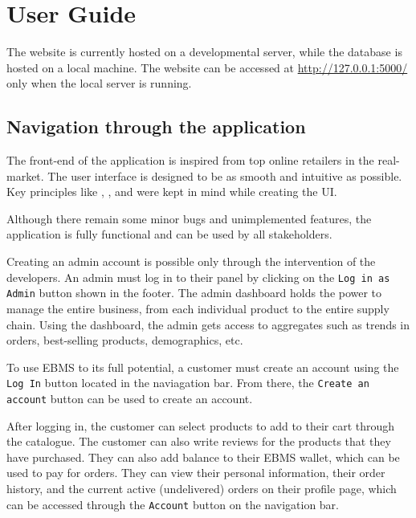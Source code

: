 \section{User Guide}

The website is currently hosted on a developmental server, while the database is hosted on a local machine.
The website can be accessed at \url{http://127.0.0.1:5000/} only when the local server is running.

\subsection*{Navigation through the application}

The front-end of the application is inspired from top online retailers in the real-market.
The user interface is designed to be as smooth and intuitive as possible.
Key principles like , , and  were kept in mind while creating the UI.

Although there remain some minor bugs and unimplemented features, the application is fully functional and can be used by all stakeholders.

\begin{stakeholder}
    Creating an admin account is possible only through the intervention of the developers.
    An admin must log in to their panel by clicking on the \texttt{Log in as Admin} button shown in the footer.
    The admin dashboard holds the power to manage the entire business, from each individual product to the entire supply chain.
    Using the dashboard, the admin gets access to aggregates such as trends in orders, best-selling products, demographics, etc.
\end{stakeholder}

\begin{stakeholder}[Customers]
    To use EBMS to its full potential, a customer must create an account using the \texttt{Log In} button located in the naviagation bar.
    From there, the \texttt{Create an account} button can be used to create an account.

    After logging in, the customer can select products to add to their cart through the catalogue.
    The customer can also write reviews for the products that they have purchased.
    They can also add balance to their EBMS wallet, which can be used to pay for orders.
    They can view their personal information, their order history, and the current active (undelivered) orders on their profile page,
    which can be accessed through the \texttt{Account} button on the navigation bar.
\end{stakeholder}

